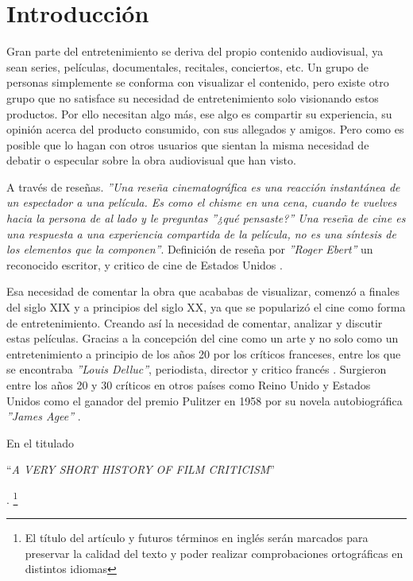 

\chapter{Introducción}

Gran parte del entretenimiento se deriva del propio contenido audiovisual, ya sean series, películas,
documentales, recitales, conciertos, etc. Un grupo de personas simplemente se conforma con visualizar 
el contenido, pero existe otro grupo que no satisface su necesidad de entretenimiento solo visionando 
estos productos. Por ello necesitan algo más, ese algo es compartir su experiencia, su opinión acerca 
del producto consumido, con sus allegados y amigos. Pero como es posible que lo hagan con otros 
usuarios que sientan la misma necesidad de debatir o especular sobre la obra audiovisual que han visto.

A través de reseñas. \textit{''Una reseña cinematográfica es una reacción instantánea de un espectador 
a una película. Es como el chisme en una cena, cuando te vuelves hacia la persona de al lado y le 
preguntas ''¿qué pensaste?'' Una reseña de cine es una respuesta a una experiencia compartida de la 
película, no es una síntesis de los elementos que la componen''}. Definición de reseña por 
\textit{''Roger Ebert''} un reconocido escritor, y critico de cine de Estados Unidos \cite{REwebsite}. 

Esa necesidad de comentar la obra que acababas de visualizar, comenzó a finales del siglo XIX y a 
principios del siglo XX, ya que se popularizó el cine como forma de entretenimiento. Creando así la 
necesidad de comentar, analizar y discutir estas películas. Gracias a la concepción del cine como un 
arte y no solo como un entretenimiento a principio de los años 20 por los críticos franceses, entre los 
que se encontraba \textit{''Louis Delluc''}, periodista, director y critico francés \cite{LouisD}. 
Surgieron entre los años 20 y 30 críticos en otros países como Reino Unido y Estados Unidos como el 
ganador del premio Pulitzer en 1958 por su novela autobiográfica \textit{''James Agee''} \cite{JamesA}. 

En el titulado \begin{otherlanguage}{english}``\textit{A VERY SHORT HISTORY OF FILM 
CRITICISM}''\end{otherlanguage}\cite{3BrothersArticle}. \footnote{El título del artículo y futuros términos en inglés serán marcados para preservar la calidad del texto y poder realizar comprobaciones ortográficas en distintos idiomas}

